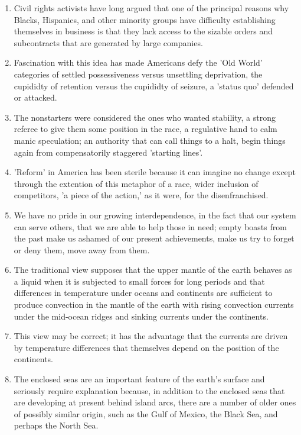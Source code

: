 \begin{enumerate}
\item Civil rights activists have long argued that one of the principal reasons why Blacks, Hispanics, and other minority groups have difficulty establishing themselves in business is that they lack access to the sizable orders and subcontracts that are generated by large companies. 

\item Fascination with this idea has made Americans defy the 'Old World' categories of settled possessiveness versus unsettling deprivation, the cupididty of retention versus the cupididty of seizure, a 'status quo' defended or attacked.

\item The nonstarters were considered the ones who wanted stability, a strong referee to give them some position in the race, a regulative hand to calm manic speculation; an authority that can call things to a halt, begin things again from compensatorily staggered 'starting lines'.

\item 'Reform' in America has been sterile because it can imagine no change except through the extention of this metaphor of a race, wider inclusion of competitors, 'a piece of the action,' as it were, for the disenfranchised.

\item We have no pride in our growing interdependence, in the fact that our system can serve others, that we are able to help those in need; empty boasts from the past make us ashamed of our present achievements, make us try to forget or deny them, move away from them.

\item The traditional view supposes that the upper mantle of the earth behaves as a liquid when it is subjected to small forces for long periods and that differences in temperature under oceans and continents are sufficient to produce convection in the mantle of the earth with rising convection currents under the mid-ocean ridges and sinking currents under the continents.

\item This view may be correct; it has the advantage that the currents are driven by temperature differences that themselves depend on the position of the continents.

\item The enclosed seas are an important feature of the earth's surface and seriously require explanation because, in addition to the enclosed seas that are developing at present behind island arcs, there are a number of older ones of possibly similar origin, such as the Gulf of Mexico, the Black Sea, and perhaps the North Sea.


\end{enumerate}
